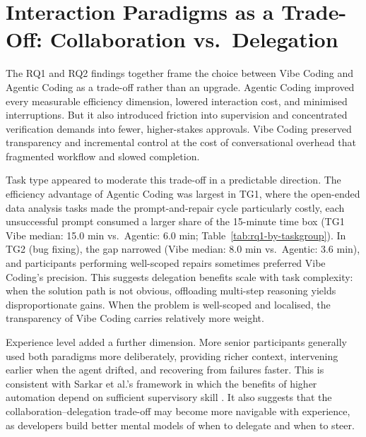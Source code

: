 
\section{Interaction Paradigms as a Trade-Off: Collaboration vs.\ Delegation}

\label{sec:disc-tradeoff}

The RQ1 and RQ2 findings together frame the choice between Vibe Coding and Agentic Coding as a trade-off rather than an upgrade. Agentic Coding improved every measurable efficiency dimension, lowered interaction cost, and minimised interruptions. But it also introduced friction into supervision and concentrated verification demands into fewer, higher-stakes approvals. Vibe Coding preserved transparency and incremental control at the cost of conversational overhead that fragmented workflow and slowed completion.

Task type appeared to moderate this trade-off in a predictable direction. The efficiency advantage of Agentic Coding was largest in TG1, where the open-ended data analysis tasks made the prompt-and-repair cycle particularly costly, each unsuccessful prompt consumed a larger share of the 15-minute time box (TG1 Vibe median: 15.0 min vs.\ Agentic: 6.0 min; Table~\ref{tab:rq1-by-taskgroup}). In TG2 (bug fixing), the gap narrowed (Vibe median: 8.0 min vs.\ Agentic: 3.6 min), and participants performing well-scoped repairs sometimes preferred Vibe Coding's precision. This suggests delegation benefits scale with task complexity: when the solution path is not obvious, offloading multi-step reasoning yields disproportionate gains. When the problem is well-scoped and localised, the transparency of Vibe Coding carries relatively more weight.

Experience level added a further dimension. More senior participants generally used both paradigms more deliberately, providing richer context, intervening earlier when the agent drifted, and recovering from failures faster. This is consistent with Sarkar et al.'s framework in which the benefits of higher automation depend on sufficient supervisory skill \parencite{sarkar2025codewithme}. It also suggests that the collaboration--delegation trade-off may become more navigable with experience, as developers build better mental models of when to delegate and when to steer.


